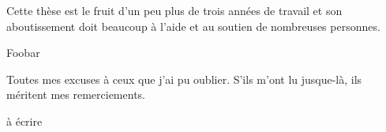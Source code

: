 
Cette thèse est le fruit d'un peu plus de trois années de travail et son
aboutissement doit beaucoup à l'aide et au soutien de nombreuses personnes. 

\medskip
Foobar
\medskip

Toutes mes excuses à ceux que j'ai pu oublier. S'ils m'ont lu jusque-là, ils
méritent mes remerciements.

\begin{atraduire}
  
à écrire

\end{atraduire}
